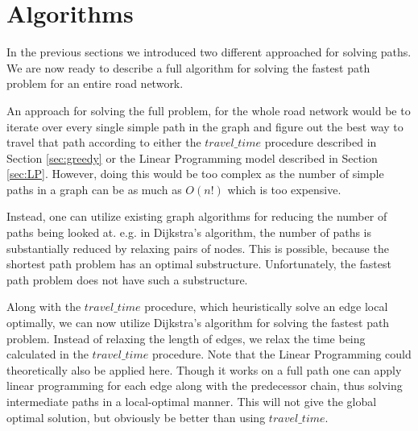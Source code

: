 \section{Algorithms}\label{sec:algo}
In the previous sections we introduced two different approached for solving paths. We are now ready to describe a full algorithm for solving the fastest path problem for an entire road network. 

An approach for solving the full problem, for the whole road network would be to iterate over every single simple path in the graph and figure out the best way to travel that path according to either the $travel\_time$ procedure described in Section \ref{sec:greedy} or the Linear Programming model described in Section \ref{sec:LP}. However, doing this would be too complex as the number of simple paths in a graph can be as much as $O(n!)$ which is too expensive.

Instead, one can utilize existing graph algorithms for reducing the number of paths being looked at. e.g. in Dijkstra's algorithm, the number of paths is substantially reduced by relaxing pairs of nodes. This is possible, because the shortest path problem has an optimal substructure. Unfortunately, the fastest path problem does not have such a substructure.

Along with the $travel\_time$ procedure, which heuristically solve an edge local optimally, we can now utilize Dijkstra's algorithm for solving the fastest path problem. Instead of relaxing the length of edges, we relax the time being calculated in the $travel\_time$ procedure. Note that the Linear Programming could theoretically also be applied here. Though it works on a full path one can apply linear programming for each edge along with the predecessor chain, thus solving intermediate paths in a local-optimal manner. This will not give the global optimal solution, but obviously be better than using $travel\_time$.

